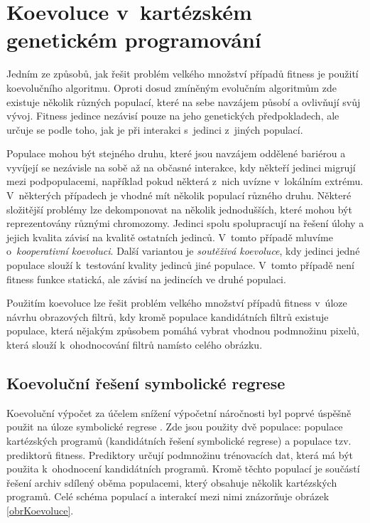 \section{Koevoluce v~kartézském genetickém programování}

Jedním ze způsobů, jak řešit problém velkého množství případů fitness je použití koevolučního algoritmu. Oproti dosud zmíněným evolučním algoritmům zde existuje několik různých populací, které na sebe navzájem působí a ovlivňují svůj vývoj. Fitness jedince nezávisí pouze na jeho genetických předpokladech, ale určuje se podle toho, jak  je při interakci s~jedinci z~jiných populací.

Populace mohou být stejného druhu, které jsou navzájem oddělené bariérou a vyvíjejí se nezávisle na sobě až na občasné interakce, kdy někteří jedinci migrují mezi podpopulacemi, například pokud některá z~nich uvízne v~lokálním extrému. V~některých případech je vhodné mít několik populací různého druhu. Některé složitější problémy lze dekomponovat na několik jednodušších, které mohou být reprezentovány různými chromozomy. Jedinci spolu spolupracují na řešení úlohy a jejich kvalita závisí na kvalitě ostatních jedinců. V~tomto případě mluvíme o~\emph{kooperativní koevoluci}. Další variantou je \emph{soutěživá koevoluce}, kdy jedinci jedné populace slouží k~testování kvality jedinců jiné populace. V~tomto případě není fitness funkce statická, ale závisí na jedincích ve druhé populaci.

Použitím koevoluce lze řešit problém velkého množství případů fitness v~úloze návrhu obrazových filtrů, kdy kromě populace kandidátních filtrů existuje populace, která nějakým způsobem pomáhá vybrat vhodnou podmnožinu pixelů, která slouží k~ohodnocování filtrů namísto celého obrázku.


\subsection{Koevoluční řešení symbolické regrese}

Koevoluční výpočet za účelem snížení výpočetní náročnosti byl poprvé úspěšně použit na úloze symbolické regrese \cite{SikuEuroGP}. Zde jsou použity dvě populace: populace kartézských programů (kandidátních řešení symbolické regrese) a populace tzv. prediktorů fitness. Prediktory určují podmnožinu trénovacích dat, která má být použita k~ohodnocení kandidátních programů. Kromě těchto populací je součástí řešení archiv sdílený oběma populacemi, který obsahuje několik kartézských programů. Celé schéma populací a interakcí mezi nimi znázorňuje obrázek \ref{obrKoevoluce}.

